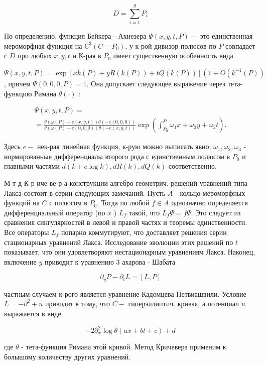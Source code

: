 \documentclass[10pt]{article}
\begin{document}
\[

D=\sum_{i=1}^{g} P_{i}

\]



По определению, функция Бейкера - Ахиезера $\Psi(x, y, t, P)-$ это единственная мероморфная функция на $\mathbb{C}^{3}\left(C-P_{0}\right)$, у к-рой дивизор полюсов по $P$ совпадает с $D$ при любых $x, y, t$ и К-рая в $P_{0}$ имеет существенную особенность вида



$\Psi(x, y, t, P)=\exp [x k(P)+y R(k(P))+t Q(k(P))]\left(1+O\left(k^{-1}(P)\right)\right.$, причем $\Psi(0,0,0, P)=1$. Она допускает следующее выражение через тета-функцию Римана $\theta(\cdot)$ :



\[

\begin{gathered}

\Psi(x, y, t, P)= \\

=\frac{\theta(\omega(P)-e(x, y, t)) \theta(-e(0,0,0))}{\theta(\omega(P)-e(0,0,0)) \theta(-e(x, y, t))} \exp \left(\int_{P_{0}}^{P} \omega_{1} x+\omega_{2} y+\omega_{3} t\right) .

\end{gathered}

\]



Здесь $e-$ нек-рая линейная функция, к-рую можно выписать явно; $\omega_{1}, \omega_{2}, \omega_{3}$ - нормированные дифференциалы второго рода с единственным полюсом в $P_{0}$ и главными частями $d(k+c \log k), d R(k), d Q(k)$ соответственно.



М т д К р иче ве р а конструкции алгебро-геометрич. решений уравнений типа Лакса состоит в серии следующих замечаний. Пусть $A$ - кольцо мероморфных функций на $C$ с полюсом в $P_{0}$. Тогда по любой $f \in A$ однозначно определяется дифференциальный оператор (по $x$ ) $L_{f}$ такой, что $L_{f} \Psi=f \Psi$. Это следует из сравнения сингулярностей в левой и правой частях и теоремы единственности. Все операторы $L_{f}$ попарно коммутируют, что доставляет решения серии стационарных уравнений Лакса. Исследование эволюции этих решений по $t$ показывает, что они удовлетворяют нестационарным уравнениям Лакса. Наконец, включение $y$ приводит к уравнению 3 ахарова - Шабата



\[

\partial_{y} P-\partial_{t} L=[L, P]

\]



частным случаем к-рого является уравнение Кадомцева Петвиашвили. Условие $L=-\partial^{2}+u$ приводит к тому, что $C-$ гиперэллиптич. кривая, а потенциал $u$ выражается в виде



\[

-2 \partial_{x}^{2} \log \theta(a x+b t+c)+d

\]



где $\theta$ - тета-функция Римана этой кривой. Метод Кричевера применим к болышому количеству других уравнений.
\end{document}
